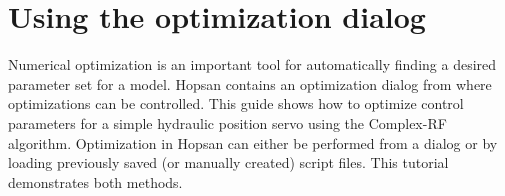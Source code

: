 \documentclass[a4paper,pdftex]{article}
\begin{document}

\section*{Using the optimization dialog}
Numerical optimization is an important tool for automatically finding a desired parameter set for a model. Hopsan contains an optimization dialog from where optimizations can be controlled. This guide shows how to optimize control parameters for a simple hydraulic position servo using the Complex-RF algorithm. Optimization in Hopsan can either be performed from a dialog or by loading previously saved (or manually created) script files. This tutorial demonstrates both methods.
\end{document}
